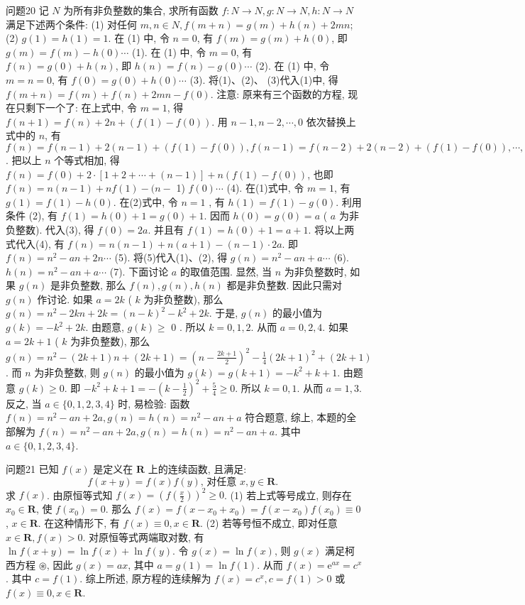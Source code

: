 问题20 记 $N$ 为所有非负整数的集合, 求所有函数 $f: N \rightarrow N, g: N \rightarrow N, h: N \rightarrow N$ 满足下述两个条件:
(1) 对任何 $m, n \in N, f(m+n)=g(m)+h(n)+2 m n$;
(2) $g(1)=h(1)=1$.
在 (1) 中, 令 $n=0$, 有 $f(m)=g(m)+h(0)$, 即 $g(m)=f(m)- h(0) \cdots$ (1). 
在 (1) 中, 令 $m=0$, 有 $f(n)=g(0)+h(n)$, 即 $h(n)=f(n)- g(0) \cdots$ (2). 
在 (1) 中, 令 $m=n=0$, 有 $f(0)=g(0)+h(0) \cdots$ (3). 
将(1)、(2)、 (3)代入(1)中, 得 $f(m+n)=f(m)+f(n)+2 m n-f(0)$. 
注意: 原来有三个函数的方程, 现在只剩下一个了: 在上式中, 令 $m=1$, 得 $f(n+1)=f(n)+ 2 n+(f(1)-f(0))$. 
用 $n-1, n-2, \cdots, 0$ 依次替换上式中的 $n$, 有 $f(n)=f(n-1)+2(n-1)+(f(1)-f(0)), f(n-1)=f(n-2)+2(n-2)+(f(1)-f(0)), \cdots, f(2)=f(1)+2 \cdot 1+(f(1)-f(0)), f(1)=f(0)+ 2 \cdot 0+(f(1)-f(0))$. 
把以上 $n$ 个等式相加, 得 $f(n)=f(0)+2 \cdot[1+2+ \cdots+(n-1)]+n(f(1)-f(0))$, 也即 $f(n)=n(n-1)+n f(1)-(n-$ 1) $f(0) \cdots$ (4). 
在(1)式中, 令 $m=1$, 有 $g(1)=f(1)-h(0)$. 
在(2)式中, 令 $n= 1$ , 有 $h(1)=f(1)-g(0)$. 
利用条件 (2), 有 $f(1)=h(0)+1=g(0)+1$. 因而 $h(0)=g(0)=a$ ( $a$ 为非负整数). 
代入(3), 得 $f(0)=2 a$. 并且有 $f(1)= h(0)+1=a+1$. 将以上两式代入(4), 有 $f(n)=n(n-1)+n(a+1)-(n- 1) \cdot 2 a$. 即 $f(n)=n^2-a n+2 n \cdots$ (5). 
将(5)代入(1)、(2), 得 $g(n)=n^2-a n+ a \cdots$ (6). $h(n)=n^2-a n+a \cdots$ (7). 
下面讨论 $a$ 的取值范围.
显然, 当 $n$ 为非负整数时, 如果 $g(n)$ 是非负整数, 那么 $f(n), g(n), h(n)$ 都是非负整数.
因此只需对 $g(n)$ 作讨论.
如果 $a=2 k$ ( $k$ 为非负整数), 那么 $g(n)=n^2-2 k n+2 k= (n-k)^2-k^2+2 k$. 
于是, $g(n)$ 的最小值为 $g(k)=-k^2+2 k$. 由题意, $g(k) \geqslant$ 0 . 所以 $k=0,1,2$. 从而 $a=0,2,4$. 
如果 $a=2 k+1$ ( $k$ 为非负整数), 那么 $g(n)=n^2-(2 k+1) n+(2 k+1)=\left(n-\frac{2 k+1}{2}\right)^2-\frac{1}{4}(2 k+1)^2+(2 k+1)$. 而 $n$ 为非负整数, 则 $g(n)$ 的最小值为 $g(k)=g(k+1)=-k^2+k+1$. 
由题意 $g(k) \geqslant 0$. 即 $-k^2+k+1=-\left(k-\frac{1}{2}\right)^2+\frac{5}{4} \geqslant 0$. 所以 $k=0,1$. 从而 $a=1,3$.  
反之, 当 $a \in\{0,1,2,3,4\}$ 时, 易检验: 函数 $f(n)=n^2-a n+ 2 a, g(n)=h(n)=n^2-a n+a$ 符合题意, 
综上, 本题的全部解为 $f(n)=n^2- a n+2 a, g(n)=h(n)=n^2-a n+a$. 其中 $a \in\{0,1,2,3,4\}$.



问题21 已知 $f(x)$ 是定义在 $\mathbf{R}$ 上的连续函数, 且满足:
$$
f(x+y)=f(x) f(y) \text {, 对任意 } x, y \in \mathbf{R} \text {. }
$$
求 $f(x)$.
由原恒等式知 $f(x)=\left(f\left(\frac{x}{2}\right)\right)^2 \geqslant 0$. 
(1) 若上式等号成立, 则存在 $x_0 \in \mathbf{R}$, 使 $f\left(x_0\right)=0$. 
那么 $f(x)=f\left(x-x_0+x_0\right)=f\left(x-x_0\right) f\left(x_0\right) \equiv 0$, $x \in \mathbf{R}$. 
在这种情形下, 有 $f(x) \equiv 0, x \in \mathbf{R}$. 
(2) 若等号恒不成立, 即对任意 $x \in \mathbf{R}, f(x)>0$. 对原恒等式两端取对数, 有 $\ln f(x+y)=\ln f(x)+ \ln f(y)$. 
令 $g(x)=\ln f(x)$, 则 $g(x)$ 满足柯西方程 $\circledast$, 因此 $g(x)=a x$, 其中 $a=g(1)=\ln f(1)$. 
从而 $f(x)=\mathrm{e}^{a x}=c^x$. 其中 $c=f(1)$. 
综上所述, 原方程的连续解为 $f(x)=c^x, c=f(1)>0$ 或 $f(x) \equiv 0, x \in \mathbf{R}$.



